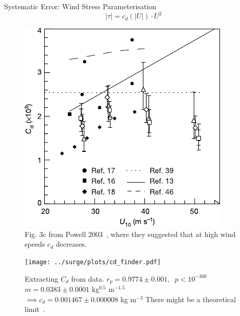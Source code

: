 \begin{frame}{Systematic Error: Wind Stress Parameterisation}
\vspace{-40pt}
\centering
\begin{equation}
 |\tau| = c_d(|U|) \cdot U^2
 \end{equation}
    \hspace{-30pt}\begin{minipage}{0.45\textwidth}
    \begin{figure}
            \includegraphics[width=1\linewidth]{images/example-images/cd.pdf}
                \caption{Fig. 3c from Powell 2003~\cite{powell2003reduced},
                 where they suggested that at high wind speeds $c_d$ decreases.}
    \end{figure}
    \end{minipage}\hspace{5pt}
      \begin{minipage}{0.57\textwidth}
\begin{figure}[htb!]
    \centering
    \texttt{[image: ../surge/plots/cd\_finder.pdf]}
    \caption{ Extracting $C_d$ from data.
    $ r_p = 0.9774 \pm 0.001,\;\; p<10^{-300}$\\
    $ m = 0.0383 \pm 0.0001 $ kg$^{0.5}$ m$^{-1.5}$\\
    $\implies  c_d = 0.001467 \pm 0.000008$ kg m$^{-3}$
    There might be a theoretical limit~\cite{donelan2004limiting}.
    }
\end{figure}
    \end{minipage}
\end{frame}
